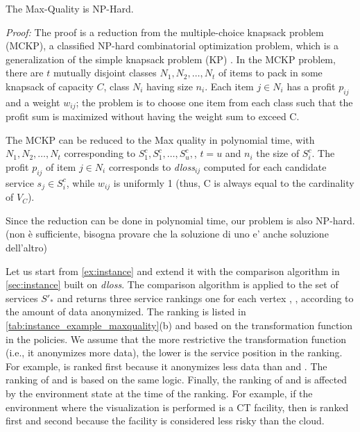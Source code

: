 \begin{theorem}\label{theorem:NP}
  The Max-Quality \problem is NP-Hard.
\end{theorem}
\emph{Proof: }
The proof is a reduction from the multiple-choice knapsack problem (MCKP), a classified NP-hard combinatorial optimization problem, which is a generalization of the simple knapsack problem (KP) \cite{}. In the MCKP problem, there are $t$ mutually disjoint classes $N_1,N_2,\ldots,N_t$ of items to pack in some knapsack of capacity $C$, class $N_i$ having size $n_i$. Each item $j$$\in$$N_i$ has a profit $p_{ij}$ and a weight $w_{ij}$; the problem is to choose one item from each class such that the profit sum is maximized without having the weight sum to exceed C.

The MCKP can be reduced to the Max quality \problem in polynomial time, with $N_1,N_2,\ldots,N_t$ corresponding to $S^c_{1}, S^c_{1}, \ldots, S^c_{u},$, $t$$=$$u$ and $n_i$ the size of $S^c_{i}$. The profit $p_{ij}$ of item $j$$\in$$N_i$ corresponds to \textit{dloss}$_{ij}$ computed for each candidate service $s_j$$\in$$S^c_{i}$, while $w_{ij}$ is uniformly 1 (thus, C is always equal to the cardinality of $V_C$).

Since the reduction can be done in polynomial time, our problem is also NP-hard. (non è sufficiente, bisogna provare che la soluzione di uno e' anche soluzione dell'altro)


\begin{example}
  Let us start from \cref{ex:instance} and extend it with the comparison algorithm in \cref{sec:instance} built on \emph{dloss}. The comparison algorithm is applied to the set of services $S'_*$ and returns three service rankings one for each vertex , ,  according to the amount of data anonymized.
  The ranking is listed in \cref{tab:instance_example_maxquality}(b) and based on the transformation function in the policies. We assume that the more restrictive the transformation function (i.e., it anonymizes more data), the lower is the service position in the ranking.
  For example,  is ranked first because it anonymizes less data than  and .
  The ranking of  and  is based on the same logic.
  Finally, the ranking of  and  is affected by the environment state at the time of the ranking.   For example, if the environment where the visualization is performed is a CT facility, then  is ranked first and  second because the facility is considered less risky than the cloud.
\end{example}

